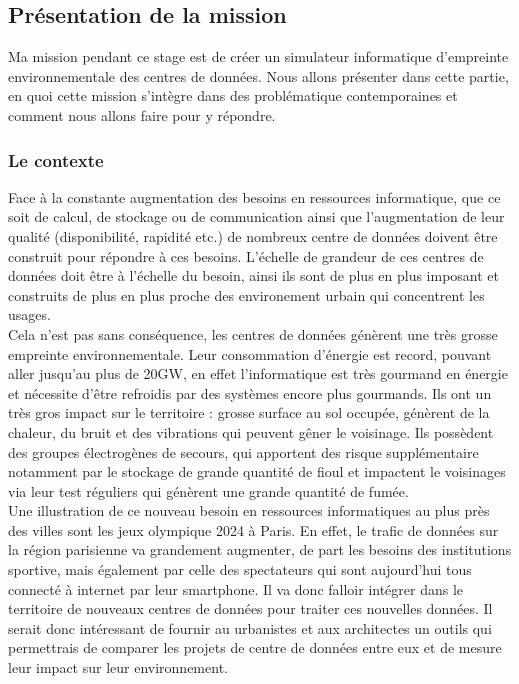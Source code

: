 \subsection{Présentation de la mission}
Ma mission pendant ce stage est de créer un simulateur informatique d'empreinte environnementale des centres de données. Nous allons présenter dans cette partie, en quoi cette mission s'intègre dans des problématique contemporaines et comment nous allons faire pour y répondre.

\subsubsection{Le contexte}
Face à la constante augmentation des besoins en ressources informatique, que ce soit de calcul, de stockage ou de communication ainsi que l'augmentation de leur qualité (disponibilité, rapidité etc.) de nombreux centre de données doivent être construit pour répondre à ces besoins. L'échelle de grandeur de ces centres de données doit être à l'échelle du besoin, ainsi ils sont de plus en plus imposant et construits de plus en plus proche des environement urbain qui concentrent les usages.\\

Cela n'est pas sans conséquence, les centres de données génèrent une très grosse empreinte environnementale. Leur consommation d'énergie est record, pouvant aller jusqu'au plus de 20GW, en effet l'informatique est très gourmand en énergie et nécessite d'être refroidis par des systèmes encore plus gourmands. Ils ont un très gros impact sur le territoire : grosse surface au sol occupée, génèrent de la chaleur, du bruit et des vibrations qui peuvent gêner le voisinage. Ils possèdent des groupes électrogènes de secours, qui apportent des risque supplémentaire notamment par le stockage de grande quantité de fioul et impactent le voisinages via leur test réguliers qui génèrent une grande quantité de fumée.\\

Une illustration de ce nouveau besoin en ressources informatiques au plus près des villes sont les jeux olympique 2024 à Paris. En effet, le trafic de données sur la région parisienne va grandement augmenter, de part les besoins des institutions sportive, mais également par celle des spectateurs qui sont aujourd'hui tous connecté à internet par leur smartphone. Il va donc falloir intégrer dans le territoire de nouveaux centres de données pour traiter ces nouvelles données. Il serait donc intéressant de fournir au urbanistes et aux architectes un outils qui permettrais de comparer les projets de centre de données entre eux et de mesure leur impact sur leur environnement.\\

